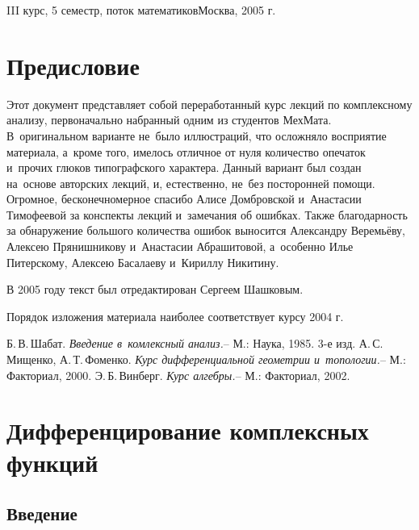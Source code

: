 \documentclass[a4paper]{article}
\begin{document}
{III курс, 5 семестр, поток математиков}{Москва, 2005 г.}

\tableofcontents

\pagebreak

\section*{Предисловие}

Этот документ представляет собой переработанный курс лекций по комплексному анализу,
первоначально набранный одним из студентов МехМата. В~оригинальном варианте не~было иллюстраций, что осложняло
восприятие материала, а~кроме того, имелось отличное от нуля количество опечаток и~прочих глюков
типографского характера. Данный вариант был создан на~основе авторских лекций, и, естественно, не~без
посторонней помощи.
Огромное, бесконечномерное спасибо Алисе Домбровской и~Анастасии Тимофеевой за
конспекты лекций и~замечания об ошибках. Также благодарность за обнаружение большого количества ошибок
выносится Александру Веремьёву, Алексею Прянишникову и~Анастасии Абрашитовой, а~особенно Илье Питерскому,
Алексею Басалаеву и~Кириллу Никитину.

В 2005 году текст был отредактирован Сергеем Шашковым.

Порядок изложения материала наиболее соответствует курсу 2004 г.

\medskip
\dmvntrail

\begin{thebibliography}{4}
\setlength\itemsep{-.5mm}
    Б.\,В.\,Шабат. \emph{Введение в~комлексный анализ.}-- М.: Наука, 1985. 3-е изд.
    А.\,С.\,Мищенко, А.\,Т.\,Фоменко. \emph{Курс дифференциальной геометрии и~топологии.}-- М.: Факториал, 2000.
    Э.\,Б.\,Винберг. \emph{Курс алгебры.}-- М.: Факториал, 2002.
\end{thebibliography}

\pagebreak

\section{Дифференцирование комплексных функций}

\subsection{Введение}
\end{document}

